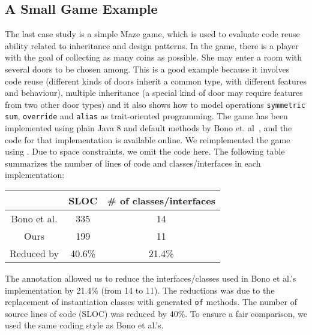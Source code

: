 \subsection{A Small Game Example}
The last case study is a simple Maze game, which is used
to evaluate code reuse ability related to inheritance and design
patterns. In the game, there is a player with the goal of collecting
as many coins as possible. She may enter a room with several doors to
be chosen among. This is a good example because it involves code reuse
(different kinds of doors inherit a common type, with different
features and behaviour), multiple inheritance (a special kind of door
may require features from two other door types) and it also shows how
to model operations \texttt{symmetric sum}, \texttt{override} and
\texttt{alias} as trait-oriented programming. The game has been
implemented using plain Java 8 and default methods by Bono
et. al~\cite{bono14}, and the code for that implementation is
available online. We reimplemented the game using \mixin. Due to space
constraints, we omit the code here. The following table summarizes
the number of lines of code and classes/interfaces in each implementation:

\vspace{5pt}
\hspace{80pt}\begin{tabular}{ccc}
\hline
            & SLOC   & \# of classes/interfaces \\ \hline
Bono et al. & 335    & 14                       \\
Ours        & 199    & 11                       \\
\rowcolor[HTML]{C0C0C0} 
Reduced by  & 40.6\% & 21.4\%                   \\ \hline
\end{tabular}
\vspace{5pt}

\noindent The \mixin annotation allowed us to reduce the interfaces/classes used
in Bono et al.'s implementation by 21.4\% (from 14 to 11). The
reductions was due to the replacement of instantiation classes with
generated \texttt{of} methods. The number of source lines of code (SLOC)
was reduced by 40\%. 
To ensure a fair comparison, we used the same coding style as Bono et al.'s.
